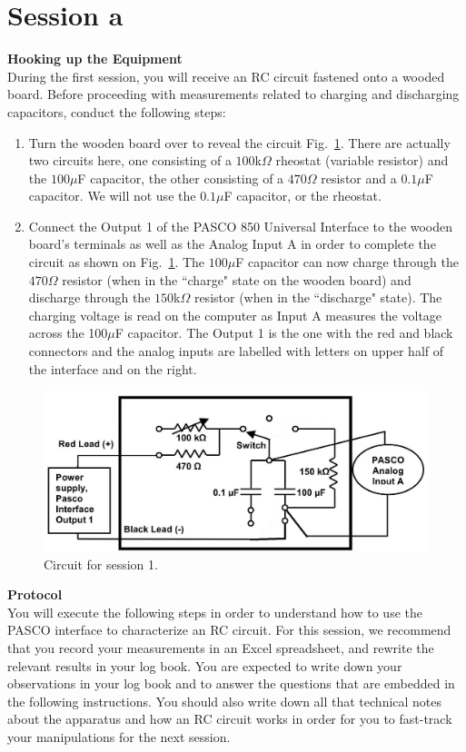 \documentclass[12pt]{report}
\begin{document}
\section{Session a}
\noindent \large \textbf{Hooking up the Equipment} \normalsize \\
During the first session, you will receive an RC circuit fastened onto a wooded board. 
Before proceeding with measurements related to charging and discharging capacitors, conduct the following steps:
\begin{enumerate}
\item Turn the wooden board over to reveal the circuit Fig.~\ref{Fig:lab2-session1-circuit1}. 
There are actually two circuits here, one consisting of a $100$k$\Omega$ rheostat (variable resistor) and the $100\mu$F capacitor, the other consisting of a $470\Omega$ resistor and a $0.1\mu$F capacitor. 
We will not use the $0.1 \mu$F capacitor, or the rheostat.
\item Connect the Output 1 of the PASCO 850 Universal Interface to the wooden board's terminals as well as the Analog Input A in order to complete the circuit as shown on Fig.~\ref{Fig:lab2-session1-circuit1}. 
The $100\mu$F capacitor can now charge through the $470\Omega$ resistor (when in the ``charge" state on the wooden board) and discharge through the $150$k$\Omega$ resistor (when in the ``discharge" state). 
The charging voltage is read on the computer as Input A measures the voltage across the 100$\mu$F capacitor. 
The Output 1 is the one with the red and black connectors and the analog inputs are labelled with letters on upper half of the interface and on the right.
\end{enumerate}

\begin{figure}[h]
\centering
\includegraphics[width=0.75\linewidth]{lab2-session1-circuit2}
\caption{Circuit for session 1.}
\label{Fig:lab2-session1-circuit1}
\end{figure}


\noindent \large \textbf{Protocol} \normalsize \\
You will execute the following steps in order to understand how to use the PASCO interface to characterize an RC circuit. 
For this session, we recommend that you {\color{blue} record your measurements in an Excel spreadsheet, and rewrite the relevant results in your log book. You are expected to write down your observations in your log book and to answer the questions that are embedded in the following instructions. You should also write down all that technical notes about the apparatus and how an RC circuit works in order for you to fast-track your manipulations for the next session.}
\end{document}
